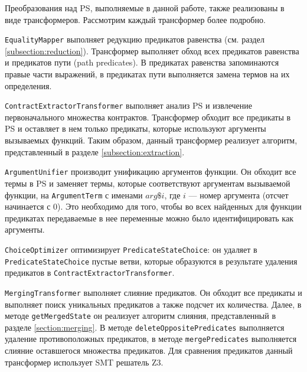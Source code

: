 Преобразования над PS, выполняемые в данной работе, также реализованы в виде трансформеров. Рассмотрим каждый трансформер более подробно.

\texttt{EqualityMapper} выполняет редукцию предикатов равенства (см. раздел \ref{subsection:reduction}). Трансформер выполняет обход всех предикатов равенства и предикатов пути (path predicates). В предикатах равенства запоминаются правые части выражений, в предикатах пути выполняется замена термов на их определения.

\texttt{ContractExtractorTransformer} выполняет анализ PS и извлечение первоначального множества контрактов. Трансформер обходит все предикаты в PS и оставляет в нем только предикаты, которые используют аргументы вызываемых функций. Таким образом, данный трансформер реализует алгоритм, представленный в разделе \ref{subsection:extraction}.

\texttt{ArgumentUnifier} производит унификацию аргументов функции. Он обходит все термы в PS и заменяет термы, которые соответствуют аргументам вызываемой функции, на \texttt{ArgumentTerm} с именами $arg\$i$, где $i$ --- номер аргумента (отсчет начинается с 0). Это необходимо для того, чтобы во всех найденных для функции предикатах передаваемые в нее переменные можно было идентифицировать как аргументы.

\texttt{ChoiceOptimizer} оптимизирует \texttt{PredicateStateChoice}: он удаляет в \texttt{PredicateStateChoice} пустые ветви, которые образуются в результате удаления предикатов в \texttt{ContractExtractorTransformer}.

\texttt{MergingTransformer} выполняет слияние предикатов. Он обходит все предикаты и выполняет поиск уникальных предикатов а также подсчет их количества. Далее, в методе \texttt{getMergedState} он реализует алгоритм слияния, представленный в разделе \ref{section:merging}. В методе \texttt{deleteOppositePredicates} выполняется удаление противоположных предикатов, в методе \texttt{mergePredicates} выполняется слияние оставшегося множества предикатов. Для сравнения предикатов данный трансформер использует SMT решатель Z3\cite{z3solver}.

